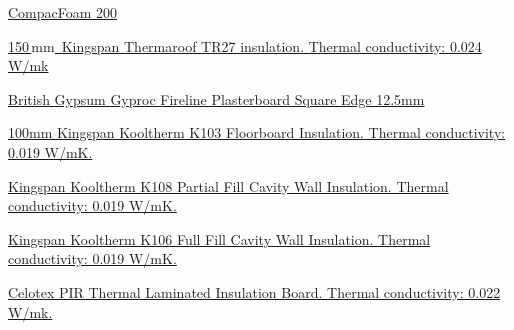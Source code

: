 \documentclass{extension}
\newcommand{\mm}{\,$\mathrm{mm}$}
\begin{document}
\begin{thebibliography}{9}
 \href{https://www.greenbuildingstore.co.uk/products/compacfoam-200/} {CompacFoam 200}

 \href{https://www.kingspan.com/gb/en/products/insulation-boards/roof-insulation-boards/thermaroof-tr27/?s=t} {150\mm\ Kingspan Thermaroof TR27 insulation. Thermal conductivity: 0.024 W/mk}

 \href{https://www.travisperkins.co.uk/fire-resistant-boards/british-gypsum-gyproc-fireline-plasterboard-square-edge-1800mm-x-900mm-x-12-5mm/p/751327} {British Gypsum Gyproc Fireline Plasterboard Square Edge 12.5mm}

 \href{https://www.travisperkins.co.uk/clearance/kingspan-kooltherm-k103-floorboard-insulation-2400mm-x-1200mm-x-100mm/p/881325?gclid=Cj0KCQjw1rqkBhCTARIsAAHz7K2E9ooPCpF4RrujHbchcasSMCTRRTU6P8Dr64iUsAXokloK77zFv8MaAq83EALw_wcB&gclsrc=aw.ds} {100mm Kingspan Kooltherm K103 Floorboard Insulation. Thermal conductivity: 0.019 W/mK.}

 \href{https://www.travisperkins.co.uk/clearance/kingspan-kooltherm-k108-cavity-insulation-board-1200-x-450-x-100mm/p/187808} {Kingspan Kooltherm K108 Partial Fill Cavity Wall Insulation. Thermal conductivity: 0.019 W/mK.}

 \href{https://www.travisperkins.co.uk/cavity-and-internal-wall-insulation/kingspan-kooltherm-k106-full-fill-cavity-wall-insulation-board-1200mm-x-450mm-x-90mm/p/881334?gclid=Cj0KCQjw1rqkBhCTARIsAAHz7K1HaYzk6zlqoV5iMFNUApx5VJQI_11hfpoJTWEc27A7wdo-6fuiQZ8aAk30EALw_wcB&gclsrc=aw.ds} {Kingspan Kooltherm K106 Full Fill Cavity Wall Insulation. Thermal conductivity: 0.019 W/mK.}

 \href{https://www.travisperkins.co.uk/thermal-insulated-plasterboard/celotex-pir-thermal-laminated-insulation-board-2400mm-x-1200mm-x-40mm-52-5mm-overall/p/778057} {Celotex PIR Thermal Laminated Insulation Board. Thermal conductivity: 0.022 W/mk.}

\end{thebibliography}
\end{document}
